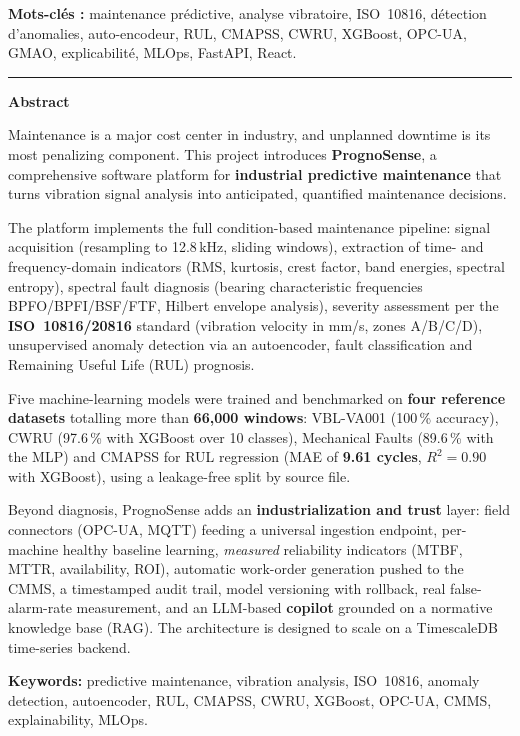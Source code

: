 \vspace{0.4cm}
\noindent\textbf{Mots-clés :} maintenance prédictive, analyse vibratoire, ISO~10816,
détection d'anomalies, auto-encodeur, RUL, CMAPSS, CWRU, XGBoost, OPC-UA, GMAO,
explicabilité, MLOps, FastAPI, React.

\vspace{0.8cm}
\begin{center}{\color{psbleu}\rule{0.5\textwidth}{0.6pt}}\end{center}
\vspace{0.4cm}

\begin{center}\textbf{\large Abstract}\end{center}

Maintenance is a major cost center in industry, and unplanned downtime is its most
penalizing component. This project introduces \textbf{PrognoSense}, a comprehensive
software platform for \textbf{industrial predictive maintenance} that turns vibration
signal analysis into anticipated, quantified maintenance decisions.

The platform implements the full condition-based maintenance pipeline: signal acquisition
(resampling to 12.8\,kHz, sliding windows), extraction of time- and frequency-domain
indicators (RMS, kurtosis, crest factor, band energies, spectral entropy), spectral fault
diagnosis (bearing characteristic frequencies BPFO/BPFI/BSF/FTF, Hilbert envelope
analysis), severity assessment per the \textbf{ISO~10816/20816} standard (vibration
velocity in mm/s, zones A/B/C/D), unsupervised anomaly detection via an autoencoder, fault
classification and Remaining Useful Life (RUL) prognosis.

Five machine-learning models were trained and benchmarked on \textbf{four reference
datasets} totalling more than \textbf{66{,}000 windows}: VBL-VA001 (100\,\% accuracy),
CWRU (97.6\,\% with XGBoost over 10 classes), Mechanical Faults (89.6\,\% with the MLP) and
CMAPSS for RUL regression (MAE of \textbf{9.61 cycles}, $R^2=0.90$ with XGBoost), using a
leakage-free split by source file.

Beyond diagnosis, PrognoSense adds an \textbf{industrialization and trust} layer: field
connectors (OPC-UA, MQTT) feeding a universal ingestion endpoint, per-machine healthy
baseline learning, \emph{measured} reliability indicators (MTBF, MTTR, availability, ROI),
automatic work-order generation pushed to the CMMS, a timestamped audit trail, model
versioning with rollback, real false-alarm-rate measurement, and an LLM-based
\textbf{copilot} grounded on a normative knowledge base (RAG). The architecture is designed
to scale on a TimescaleDB time-series backend.

\vspace{0.3cm}
\noindent\textbf{Keywords:} predictive maintenance, vibration analysis, ISO~10816, anomaly
detection, autoencoder, RUL, CMAPSS, CWRU, XGBoost, OPC-UA, CMMS, explainability, MLOps.
